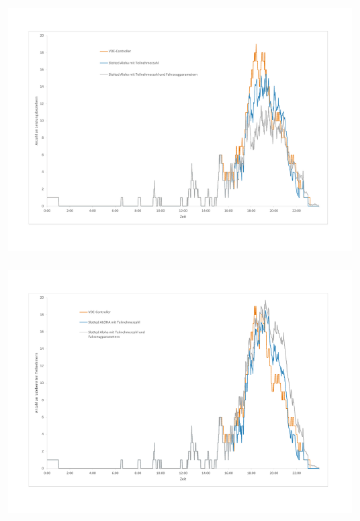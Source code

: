 \begin{figure}
	\begin{subfigure}{\linewidth}
		\includegraphics[scale=0.5]{img/ohneTrafo/Teilnehmer2.pdf}
        \label{ABB_oT_Teil1}
	\end{subfigure}
	\begin{subfigure}{\linewidth}
		\includegraphics[scale=0.5]{img/ohneTrafo/Teilnehmer3.pdf}
        \label{ABB_oT_teil2}
	\end{subfigure}
\end{figure}
